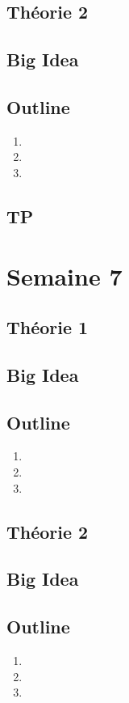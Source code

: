 \documentclass{article}
\begin{document}
\subsection{Théorie 2}
\subsection*{Big Idea}
\subsection*{Outline}
    \begin{enumerate}
    \item
    \item
    \item
    \end{enumerate}
\subsection{TP}

\pagebreak
\section{Semaine 7}
\subsection{Théorie 1}
\subsection*{Big Idea}
\subsection*{Outline}
    \begin{enumerate}
    \item
    \item
    \item
    \end{enumerate}
\subsection{Théorie 2}
\subsection*{Big Idea}
\subsection*{Outline}
    \begin{enumerate}
    \item
    \item
    \item
    \end{enumerate}
\end{document}
